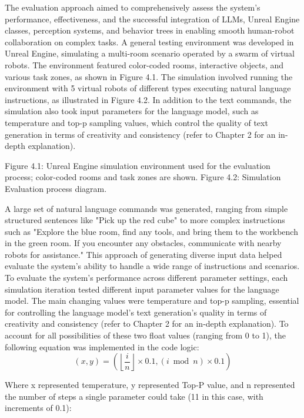\documentclass[pdflatex,sn-mathphys-num]{sn-jnl}%
\theoremstyle{thmstyleone}
\theoremstyle{thmstyletwo}%
\theoremstyle{thmstylethree}%
\begin{document}
The evaluation approach aimed to comprehensively assess the system's performance, effectiveness, and the successful integration of LLMs, Unreal Engine classes, perception systems, and behavior trees in enabling smooth human-robot collaboration on complex tasks. A general testing environment was developed in Unreal Engine, simulating a multi-room scenario operated by a swarm of virtual robots. The environment featured color-coded rooms, interactive objects, and various task zones, as shown in Figure 4.1.
The simulation involved running the environment with 5 virtual robots of different types executing natural language instructions, as illustrated in Figure 4.2. In addition to the text commands, the simulation also took input parameters for the language model, such as temperature and top-p sampling values, which control the quality of text generation in terms of creativity and consistency (refer to Chapter 2 for an in-depth explanation).

Figure 4.1: Unreal Engine simulation environment used for the evaluation process; color-coded rooms and task zones are shown.
Figure 4.2: Simulation Evaluation process diagram.


A large set of natural language commands was generated, ranging from simple structured sentences like "Pick up the red cube" to more complex instructions such as "Explore the blue room, find any tools, and bring them to the workbench in the green room. If you encounter any obstacles, communicate with nearby robots for assistance." This approach of generating diverse input data helped evaluate the system's ability to handle a wide range of instructions and scenarios.
To evaluate the system's performance across different parameter settings, each simulation iteration tested different input parameter values for the language model. The main changing values were temperature and top-p sampling, essential for controlling the language model's text generation's quality in terms of creativity and consistency (refer to Chapter 2 for an in-depth explanation).
To account for all possibilities of these two float values (ranging from 0 to 1), the following equation was implemented in the code logic:
\begin{equation}
(x, y) = \left(\left\lfloor\frac{i}{n}\right\rfloor \times 0.1, (i \bmod n) \times 0.1\right)
\end{equation}

Where x represented temperature, y represented Top-P value, and n represented the number of steps a single parameter could take (11 in this case, with increments of 0.1):
\end{document}
